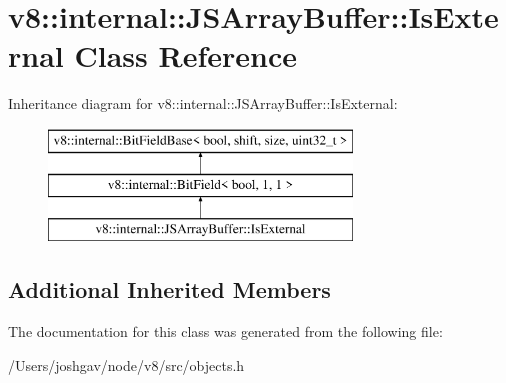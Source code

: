 \hypertarget{classv8_1_1internal_1_1_j_s_array_buffer_1_1_is_external}{}\section{v8\+:\+:internal\+:\+:J\+S\+Array\+Buffer\+:\+:Is\+External Class Reference}
\label{classv8_1_1internal_1_1_j_s_array_buffer_1_1_is_external}
Inheritance diagram for v8\+:\+:internal\+:\+:J\+S\+Array\+Buffer\+:\+:Is\+External\+:\begin{figure}[H]
\begin{center}
\leavevmode
\includegraphics[height=3.000000cm]{classv8_1_1internal_1_1_j_s_array_buffer_1_1_is_external}
\end{center}
\end{figure}
\subsection*{Additional Inherited Members}


The documentation for this class was generated from the following file\+:\begin{DoxyCompactItemize}
\item 
/\+Users/joshgav/node/v8/src/objects.\+h\end{DoxyCompactItemize}
